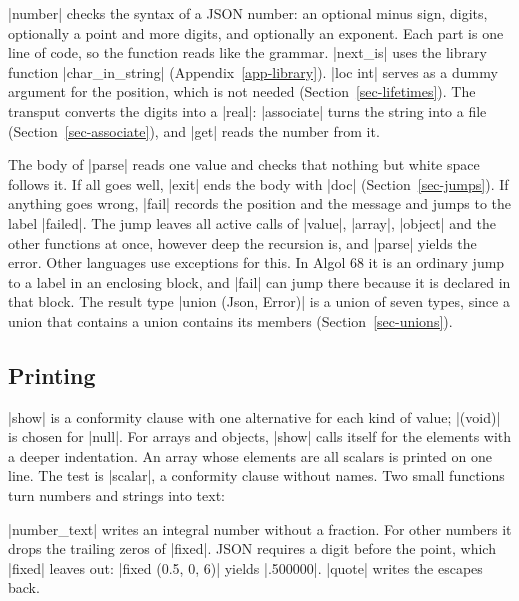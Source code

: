 \code|number| checks the syntax of a JSON number: an optional minus
sign, digits, optionally a point and more digits, and optionally an
exponent. Each part is one line of code, so the function reads like the
grammar. \code|next_is| uses the library function
\code|char_in_string| (Appendix~\ref{app-library}). \code|loc int|
serves as a dummy argument for the position, which is not needed
(Section~\ref{sec-lifetimes}). The transput converts the digits into a
\code|real|: \code|associate| turns the string into a file
(Section~\ref{sec-associate}), and \code|get| reads the number from it.


The body of \code|parse| reads one value and checks that nothing but
white space follows it. If all goes well, \code|exit| ends the body with
\code|doc| (Section~\ref{sec-jumps}). If anything goes wrong,
\code|fail| records the position and the message and jumps to the label
\code|failed|. The jump leaves all active calls of \code|value|,
\code|array|, \code|object| and the other functions at once, however
deep the recursion is, and \code|parse| yields the error. Other languages
use exceptions for this. In Algol 68 it is an ordinary jump to a label in
an enclosing block, and \code|fail| can jump there because it is declared
in that block. The result type \code|union (Json, Error)| is a union of
seven types, since a union that contains a union contains its members
(Section~\ref{sec-unions}).

\subsection*{Printing}


\code|show| is a conformity clause with one alternative for each kind of
value; \code|(void)| is chosen for \code|null|. For arrays and objects,
\code|show| calls itself for the elements with a deeper indentation. An
array whose elements are all scalars is printed on one line. The test is
\code|scalar|, a conformity clause without names. Two small functions
turn numbers and strings into text:


\code|number_text| writes an integral number without a fraction. For
other numbers it drops the trailing zeros of \code|fixed|. JSON requires
a digit before the point, which \code|fixed| leaves out:
\code|fixed (0.5, 0, 6)| yields \code|.500000|. \code|quote| writes the
escapes back.

